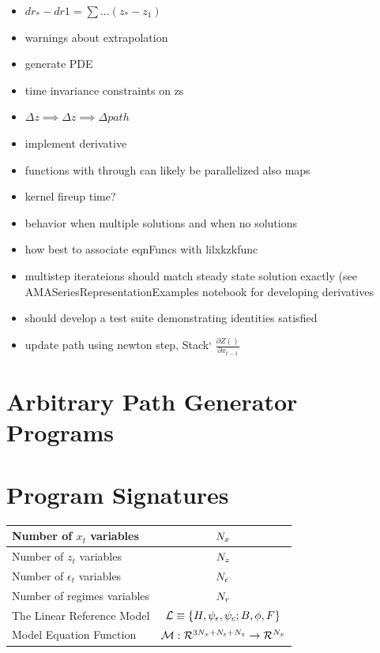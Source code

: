\documentclass[12pt]{article}
\begin{document}
\begin{itemize}
\item $dr_\ast - dr1= \sum ... (z_\ast-z_1)$
\item warnings about extrapolation
\item generate PDE
\item time invariance constraints on zs 
\item $ \Delta z \implies \Delta z \implies \Delta path$
\item implement derivative
\item functions with through can likely be parallelized also maps
\item kernel fireup time?
\item behavior when multiple solutions and when no solutions
\item how best to associate eqnFuncs with lilxkzkfunc 
\item multistep iterateions should match steady state solution exactly (see 
AMASeriesRepresentationExamples notebook for developing derivatives
\item should develop a test suite demonstrating identities satisfied
\item update path using newton step,  Stack` $\frac{\partial Z()}{\partial x_{t-1}}$
\end{itemize}

\newpage
\appendix

\section{Arbitrary Path Generator Programs}
\label{sec:arbitr-path-gener}


\section{Program Signatures}
\label{sec:program-listings}
\begin{tabular}{|l|c|}
\hline
Number of $x_t$ variables&${N_x}$\\
\hline
Number of $z_t$ variables&${N_z}$\\
\hline
Number of $\epsilon_t$ variables&${N_\epsilon}$\\
\hline
Number of regimes variables&${N_r}$\\
\hline
The Linear Reference Model&${\mathcal{L}}\equiv{\{H,\psi_\epsilon,\psi_c;B,\phi,F\}}$\\  
\hline
Model Equation Function&${\mathcal{M}:{\mathcal{R}^{3{N_x}+{N_\epsilon}+{N_z}}}\rightarrow{\mathcal{R}^{{N_x}}}}$\\
\hline
\end{tabular}
\end{document}
